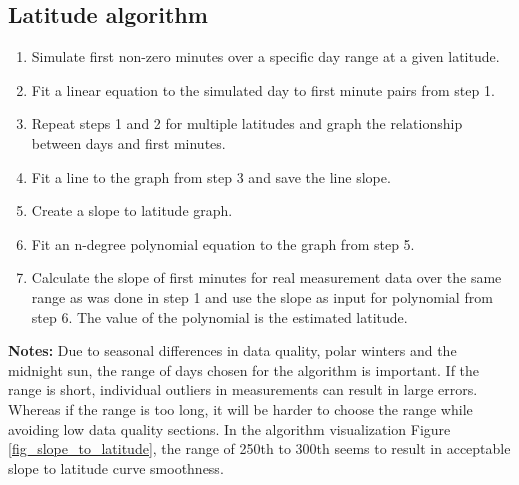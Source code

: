 \hfill


\subsection{Latitude algorithm}
\begin{enumerate}
  \item Simulate first non-zero minutes over a specific day range at a given latitude.
  
  \item Fit a linear equation to the simulated day to first minute pairs from step 1.
  
  \item Repeat steps 1 and 2 for multiple latitudes and graph the relationship between days and first minutes.
  
  \item Fit a line to the graph from step 3 and save the line slope.
  
  \item Create a slope to latitude graph.
  
  \item Fit an n-degree polynomial equation to the graph from step 5.
  
  \item Calculate the slope of first minutes for real measurement data over the same range as was done in step 1 and use the slope as input for polynomial from step 6. The value of the polynomial is the estimated latitude.
  
\end{enumerate}

\noindent
\textbf{Notes:}
Due to seasonal differences in data quality, polar winters and the midnight sun, the range of days chosen for the algorithm is important. If the range is short, individual outliers in measurements can result in large errors. Whereas if the range is too long, it will be harder to choose the range while avoiding low data quality sections. In the algorithm visualization Figure \ref{fig_slope_to_latitude}, the range of 250th to 300th seems to result in acceptable slope to latitude curve smoothness.
\newpage

